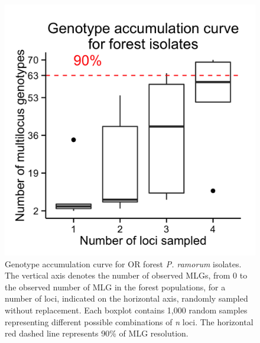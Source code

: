 \documentclass[double,12pt]{beavtex}
\begin{document}
  \begin{figure}
  
  {\centering \includegraphics[width=0.8\linewidth]{figure/phytopathology/figureS2} 
  
  }
  
  \caption[Genotype accumulation curve for OR forest \emph{P. ramorum} isolates.]{Genotype accumulation curve for OR forest \emph{P. ramorum} isolates.
  The vertical axis denotes the number of observed MLGs, from 0 to the
  observed number of MLG in the forest populations, for a number of loci,
  indicated on the horizontal axis, randomly sampled without replacement.
  Each boxplot contains 1,000 random samples representing different
  possible combinations of \emph{n} loci. The horizontal red dashed line
  represents 90\% of MLG resolution.}\label{fig:ramS2}
  \end{figure}
  
\end{document}
